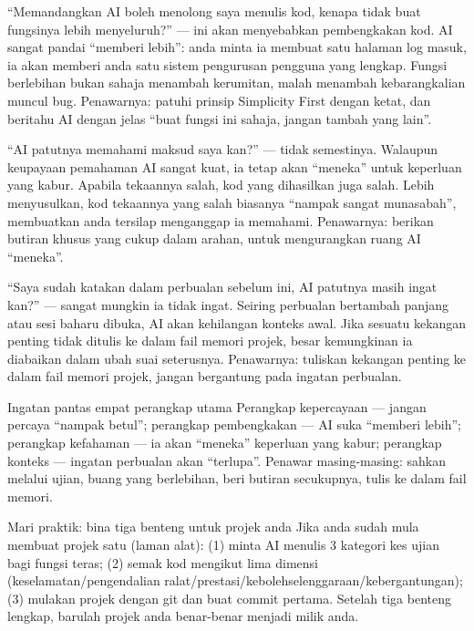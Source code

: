 
“Memandangkan AI boleh menolong saya menulis kod, kenapa tidak buat fungsinya lebih menyeluruh?” — ini akan menyebabkan pembengkakan kod. AI sangat pandai “memberi lebih”: anda minta ia membuat satu halaman log masuk, ia akan memberi anda satu sistem pengurusan pengguna yang lengkap. Fungsi berlebihan bukan sahaja menambah kerumitan, malah menambah kebarangkalian muncul bug. Penawarnya: patuhi prinsip Simplicity First dengan ketat, dan beritahu AI dengan jelas “buat fungsi ini sahaja, jangan tambah yang lain”.


“AI patutnya memahami maksud saya kan?” — tidak semestinya. Walaupun keupayaan pemahaman AI sangat kuat, ia tetap akan “meneka” untuk keperluan yang kabur. Apabila tekaannya salah, kod yang dihasilkan juga salah. Lebih menyusulkan, kod tekaannya yang salah biasanya “nampak sangat munasabah”, membuatkan anda tersilap menganggap ia memahami. Penawarnya: berikan butiran khusus yang cukup dalam arahan, untuk mengurangkan ruang AI “meneka”.


“Saya sudah katakan dalam perbualan sebelum ini, AI patutnya masih ingat kan?” — sangat mungkin ia tidak ingat. Seiring perbualan bertambah panjang atau sesi baharu dibuka, AI akan kehilangan konteks awal. Jika sesuatu kekangan penting tidak ditulis ke dalam fail memori projek, besar kemungkinan ia diabaikan dalam ubah suai seterusnya. Penawarnya: tuliskan kekangan penting ke dalam fail memori projek, jangan bergantung pada ingatan perbualan.

\begin{tcbwarn}{Ingatan pantas empat perangkap utama}
Perangkap kepercayaan — jangan percaya “nampak betul”; perangkap pembengkakan — AI suka “memberi lebih”; perangkap kefahaman — ia akan “meneka” keperluan yang kabur; perangkap konteks — ingatan perbualan akan “terlupa”. Penawar masing-masing: sahkan melalui ujian, buang yang berlebihan, beri butiran secukupnya, tulis ke dalam fail memori.

\end{tcbwarn}

\begin{tcbpractice}{Mari praktik: bina tiga benteng untuk projek anda}
Jika anda sudah mula membuat projek satu (laman alat): (1) minta AI menulis 3 kategori kes ujian bagi fungsi teras; (2) semak kod mengikut lima dimensi (keselamatan/pengendalian ralat/prestasi/kebolehselenggaraan/kebergantungan); (3) mulakan projek dengan git dan buat commit pertama. Setelah tiga benteng lengkap, barulah projek anda benar-benar menjadi milik anda.

\end{tcbpractice}

